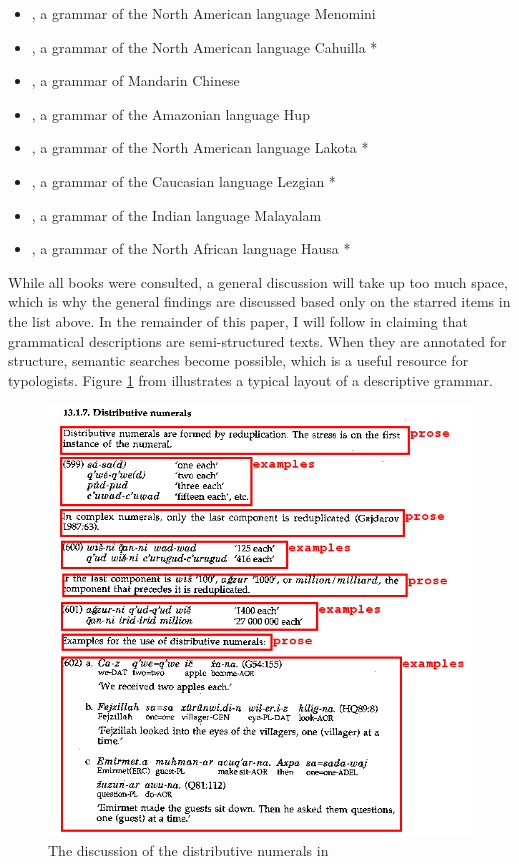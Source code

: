 \documentclass[a4paper,12pt]{article}
\begin{document}
\begin{itemize}
 \item \citet{Bloomfield1962}, a grammar of the North American language Menomini
 \item \citet{Seiler1985}, a grammar of the North American language Cahuilla *
 \item \citet{LiEtAl1981}, a grammar of Mandarin Chinese
 \item \citet{Epps2008}, a grammar of the Amazonian language Hup
 \item \citet{Buechel1939}, a grammar of the North American language Lakota *
 \item \citet{Haspelmath1993}, a grammar of the Caucasian language Lezgian * 
 \item \citet{Frohnmeyer1889}, a grammar of the Indian language Malayalam
 \item \citet{Newman2000}, a grammar of the North African language Hausa *
\end{itemize}

While all books were consulted, a general discussion will take up too much space, which is why the general findings are discussed based only on the starred items in the list above. In the remainder of this paper, I will follow \citet{Good2004} in  claiming that grammatical descriptions are semi-structured texts. When they are annotated for structure, semantic searches become possible, which is a useful resource for typologists. Figure \ref{fig:lezgian} from \citet{Haspelmath1993} illustrates a typical layout of a descriptive grammar.


\begin{figure}
\includegraphics[width=\textwidth]{lezgian} 
\caption{The discussion of the distributive numerals in \citet{Haspelmath1993}}
\label{fig:lezgian}
\end{figure}
\end{document}
